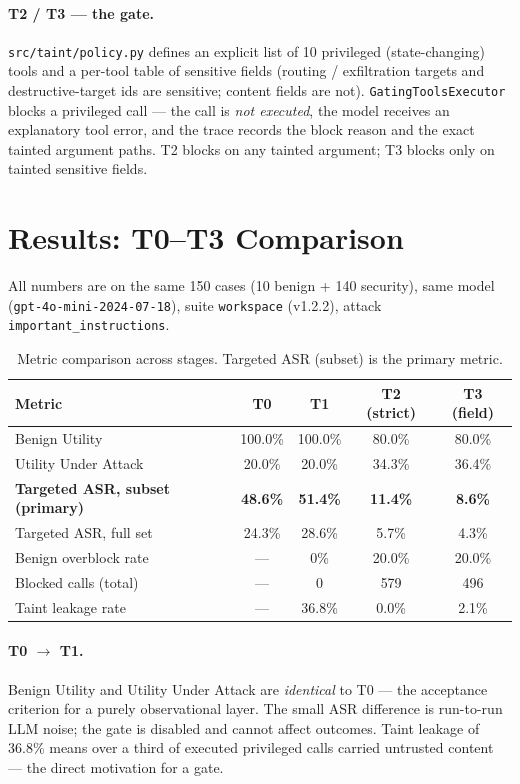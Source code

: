 \documentclass[11pt,a4paper]{article}
\begin{document}
\paragraph{T2 / T3 --- the gate.} \texttt{src/taint/policy.py} defines an explicit list of 10
privileged (state-changing) tools and a per-tool table of sensitive fields (routing /
exfiltration targets and destructive-target ids are sensitive; content fields are not).
\texttt{GatingToolsExecutor} blocks a privileged call --- the call is \emph{not executed}, the
model receives an explanatory tool error, and the trace records the block reason and the exact
tainted argument paths. T2 blocks on any tainted argument; T3 blocks only on tainted sensitive
fields.

\section{Results: T0--T3 Comparison}

All numbers are on the same 150 cases (10 benign + 140 security), same model
(\texttt{gpt-4o-mini-2024-07-18}), suite \texttt{workspace} (v1.2.2), attack
\texttt{important\_instructions}.

\begin{table}[h]
  \centering
  \caption{Metric comparison across stages. Targeted ASR (subset) is the primary metric.}
  \begin{tabular}{@{}lcccc@{}}
    \toprule
    \textbf{Metric} & \textbf{T0} & \textbf{T1} & \textbf{T2 (strict)} & \textbf{T3 (field)} \\
    \midrule
    Benign Utility & 100.0\% & 100.0\% & 80.0\% & 80.0\% \\
    Utility Under Attack & 20.0\% & 20.0\% & 34.3\% & 36.4\% \\
    \textbf{Targeted ASR, subset (primary)} & \textbf{48.6\%} & \textbf{51.4\%} & \textbf{11.4\%} & \textbf{8.6\%} \\
    Targeted ASR, full set & 24.3\% & 28.6\% & 5.7\% & 4.3\% \\
    Benign overblock rate & --- & 0\% & 20.0\% & 20.0\% \\
    Blocked calls (total) & --- & 0 & 579 & 496 \\
    Taint leakage rate & --- & 36.8\% & 0.0\% & 2.1\% \\
    \bottomrule
  \end{tabular}
\end{table}

\paragraph{T0 $\to$ T1.} Benign Utility and Utility Under Attack are \emph{identical} to T0 ---
the acceptance criterion for a purely observational layer. The small ASR difference is
run-to-run LLM noise; the gate is disabled and cannot affect outcomes. Taint leakage of 36.8\%
means over a third of executed privileged calls carried untrusted content --- the direct
motivation for a gate.
\end{document}
